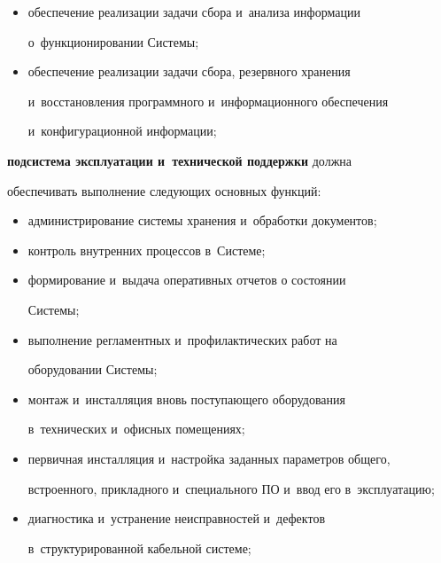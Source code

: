 \begin{description}
\begin{itemize}
информации о событиях и~выполнение заранее предопределенных действий;


     \item обеспечение реализации задачи сбора и~анализа информации 


о~функционировании Системы; 


     \item  обеспечение реализации задачи сбора, резервного хранения 


и~восстановления программного и~информационного обеспечения 


и~конфигурационной информации;


     \end{itemize}


     


 \item[\,]    \textbf{подсистема эксплуатации и~технической поддержки} должна 


обеспечивать выполнение следующих основных функций:


     \begin{itemize}


     \item  администрирование системы хранения и~обработки документов;


     \item контроль внутренних процессов в~Системе;


     \item формирование и~выдача оперативных отчетов о состоянии 


Системы;


     \item выполнение регламентных и~профилактических работ на 


оборудовании Сис\-темы;


     \item монтаж и~инсталляция вновь поступающего оборудования 


в~технических и~офисных помещениях;


     \item первичная инсталляция и~настройка заданных параметров общего, 


встроенного, прикладного и~специального ПО и~ввод его в~эксплуатацию;


     \item диагностика и~устранение неисправностей и~дефектов 


в~структурированной кабельной системе;



\end{itemize}
\end{description}
